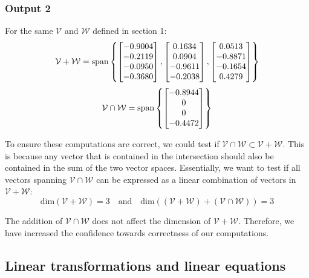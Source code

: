 \documentclass[10pt]{article}
\begin{document}
\subsubsection{Output 2}
For the same $\mathcal{V}$ and $\mathcal{W}$ defined in section 1:
\begin{equation*}
    {\mathcal{V} + \mathcal{W}} = \text{span}
    \begin{Bmatrix}
        \begin{bmatrix} -0.9004\\-0.2119\\-0.0950\\-0.3680 \end{bmatrix},
        \begin{bmatrix} 0.1634\\0.0904\\-0.9611\\-0.2038 \end{bmatrix},
        \begin{bmatrix} 0.0513\\-0.8871\\-0.1654\\0.4279 \end{bmatrix}
    \end{Bmatrix}
\end{equation*}
\begin{equation*}
    {\mathcal{V} \cap \mathcal{W}} = \text{span}
    \begin{Bmatrix}
        \begin{bmatrix} -0.8944\\0\\0\\-0.4472 \end{bmatrix}
    \end{Bmatrix}
\end{equation*}

To ensure these computations are correct, we could test if ${\mathcal{V} \cap \mathcal{W}} \subset \mathcal{V} + \mathcal{W}$. This is because any vector that is contained in the intersection should also be contained in the sum of the two vector spaces. Essentially, we want to test if all vectors spanning ${\mathcal{V} \cap \mathcal{W}}$ can be expressed as a linear combination of vectors in $\mathcal{V} + \mathcal{W}$:
\begin{equation*}
    \text{dim}(\mathcal{V} + \mathcal{W}) = 3
    \quad
    \text{and}
    \quad
    \text{dim}\left((\mathcal{V} + \mathcal{W}) + (\mathcal{V} \cap \mathcal{W})\right) = 3
\end{equation*}

The addition of $\mathcal{V} \cap \mathcal{W}$ does not affect the dimension of $\mathcal{V} + \mathcal{W}$. Therefore, we have increased the confidence towards correctness of our computations.

\subsection{Linear transformations and linear equations}
\end{document}
